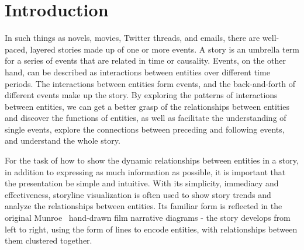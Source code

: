 	
	
	
\section{Introduction}


\noindent In such things as novels, movies, Twitter threads, and emails, there are well-paced, layered stories made up of one or more events. A story is an umbrella term for a series of events that are related in time or causality. Events, on the other hand, can be described as interactions between entities over different time periods. The interactions between entities form events, and the back-and-forth of different events make up the story. By exploring the patterns of interactions between entities, we can get a better grasp of the relationships between entities and discover the functions of entities, as well as facilitate the understanding of single events, explore the connections between preceding and following events, and understand the whole story.

For the task of how to show the dynamic relationships between entities in a story, in addition to expressing as much information as possible, it is important that the presentation be simple and intuitive. With its simplicity, immediacy and effectiveness, storyline visualization is often used to show story trends and analyze the relationships between entities. Its familiar form is reflected in the original Munroe~\cite{r_movie_nodate} hand-drawn film narrative diagrams - the story develops from left to right, using the form of lines to encode entities, with relationships between them clustered together.

